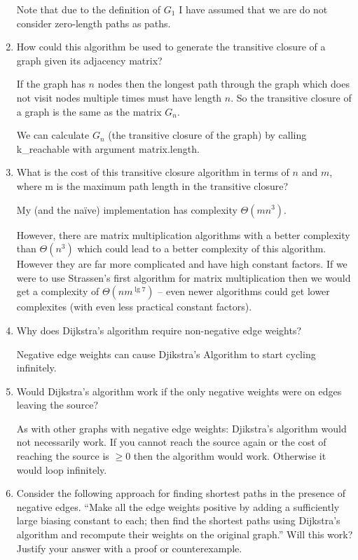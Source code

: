 \documentclass[10pt,\jkfside,a4paper]{article}
\begin{document}
\begin{enumerate}
Note that due to the definition of $G_1$ I have assumed that we are do not consider 
zero-length paths as paths.

\item How could this algorithm be used to generate the transitive closure of a graph given its 
adjacency matrix?

If the graph has $n$ nodes then the longest path through the graph which does not visit nodes 
multiple times must have length $n$. So the transitive closure of a graph is the same as the 
matrix $G_n$.

We can calculate $G_n$ (the transitive closure of the graph) by calling k\_reachable with 
argument matrix.length.

\item What is the cost of this transitive closure algorithm in terms of $n$ and $m$, where m is the 
maximum path length in the transitive closure?

My (and the na\"ive) implementation has complexity $\Theta(mn^3)$.

However, there are matrix multiplication algorithms with a better complexity than $\Theta(n^3)$ which 
could lead to a better complexity of this algorithm. However they are far more complicated and have 
high constant factors. If we were to use Strassen's first algorithm for matrix multiplication then 
we would get a complexity of $\Theta(nm^{\lg 7})$ -- even newer algorithms could get 
lower complexites (with even less practical constant factors).

\item Why does Dijkstra's algorithm require non-negative edge weights?

Negative edge weights can cause Djikstra's Algorithm to start cycling infinitely.

\item Would Dijkstra's algorithm work if the only negative weights were on edges leaving 
the source?

As with other graphs with negative edge weights: Djikstra's algorithm would not necessarily work. 
If you cannot reach the source again or the cost of reaching the source is $\geq 0$ then the 
algorithm would work. Otherwise it would loop infinitely.

\item Consider the following approach for finding shortest paths in the presence of negative edges. 
``Make all the edge weights positive by adding a sufficiently large biasing constant to each; then 
find the shortest paths using Dijkstra's algorithm and recompute their weights on the original graph.'' 
Will this work? Justify your answer with a proof or counterexample.


\end{enumerate}
\end{document}

